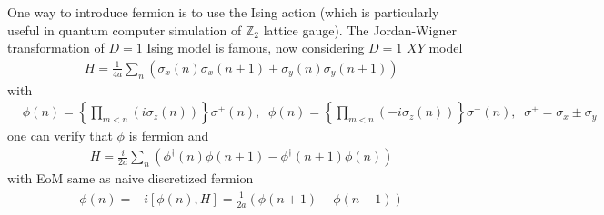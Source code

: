 One way to introduce fermion is to use the Ising action (which is particularly useful in quantum computer simulation of $\mathbb{Z}_2$ lattice gauge). The Jordan-Wigner transformation of $D=1$ Ising model is famous, now considering $D=1$ $XY$ model
\begin{equation}
\begin{split}
&H=\frac{1}{4a}\sum _n \left(\sigma _x(n)\sigma _x(n+1)+\sigma _y(n)\sigma _y(n+1)\right)
\end{split}
\end{equation}
with
\begin{equation}
\begin{split}
&\phi (n)=\left\{\prod _{m<n}(i\sigma _z(n))\right\}\sigma ^+(n),\;\;\phi (n)=\left\{\prod _{m<n}(-i\sigma _z(n))\right\}\sigma ^-(n),\;\;\sigma ^{\pm}=\sigma _x\pm \sigma _y
\end{split}
\end{equation}
one can verify that $\phi$ is fermion and
\begin{equation}
\begin{split}
&H=\frac{i}{2a}\sum _n \left(\phi ^{\dagger}(n)\phi(n+1) -\phi ^{\dagger}(n+1)\phi(n)\right)
\end{split}
\end{equation}
with EoM same as naive discretized fermion
\begin{equation}
\begin{split}
&\dot{\phi}(n)=-i[\phi (n), H]=\frac{1}{2a} \left(\phi (n+1)-\phi (n-1)\right)
\end{split}
\end{equation}
